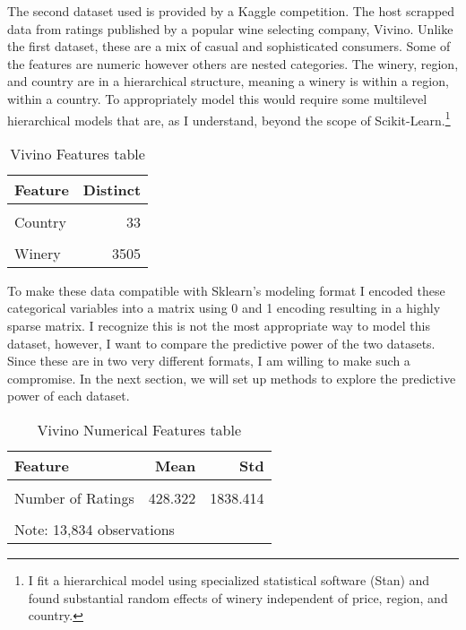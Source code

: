 \documentclass[16pt,twocolumn,letterpaper,titlepage]{article}
\begin{document}
The second dataset used is provided by a Kaggle\cite{kaggle} competition. The host scrapped data from ratings published by a popular wine selecting company, Vivino. Unlike the first dataset, these are a mix of casual and sophisticated consumers. Some of the features are numeric however others are nested categories. The winery, region, and country are in a hierarchical structure, meaning a winery is within a region, within a country. To appropriately model this would require some multilevel hierarchical models that are, as I understand, beyond the scope of Scikit-Learn.\footnote{I fit a hierarchical model using specialized statistical software (Stan) and found substantial random effects of winery independent of price, region, and country.}

\begin{table}[!h]

\caption{Vivino Features table}
\centering
\begin{tabular}[t]{lr}
\toprule
Feature & Distinct\\
\midrule
\cellcolor{gray!6}{Wine Type} & \cellcolor{gray!6}{4}\\
Country & 33\\
\cellcolor{gray!6}{Region} & \cellcolor{gray!6}{861}\\
Winery & 3505\\
\bottomrule
\end{tabular}
\end{table}

To make these data compatible with Sklearn's modeling format I encoded these categorical variables into a matrix using 0 and 1 encoding resulting in a highly sparse matrix. I recognize this is not the most appropriate way to model this dataset, however, I want to compare the predictive power of the two datasets. Since these are in two very different formats, I am willing to make such a compromise. In the next section, we will set up methods to explore the predictive power of each dataset.

\begin{table}[!h]

\caption{Vivino Numerical Features table}
\centering
\begin{tabular}[t]{lrr}
\toprule
Feature & Mean & Std\\
\midrule
\cellcolor{gray!6}{Rating} & \cellcolor{gray!6}{3.866} & \cellcolor{gray!6}{0.296}\\
Number of Ratings & 428.322 & 1838.414\\
\cellcolor{gray!6}{Price} & \cellcolor{gray!6}{33.025} & \cellcolor{gray!6}{70.900}\\
\bottomrule
\multicolumn{3}{l}{Note: 13,834 observations}\\
\end{tabular}
\end{table}
\end{document}
